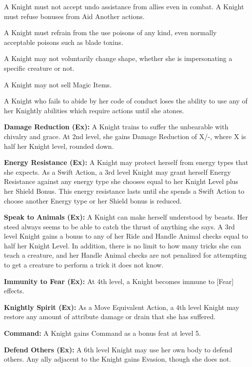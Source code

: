 \begin{itemize*}
\item A Knight must not accept undo assistance from allies even in combat. A Knight must refuse bonuses from Aid Another actions.
\item A Knight must refrain from the use poisons of any kind, even normally acceptable poisons such as blade toxins.
\item A Knight may not voluntarily change shape, whether she is impersonating a specific creature or not.
\item A Knight may not sell Magic Items.
\end{itemize*}

A Knight who fails to abide by her code of conduct loses the ability to use any of her Knightly abilities which require actions until she atones.

\textbf{Damage Reduction (Ex):} A Knight trains to suffer the unbearable with chivalry and grace. At 2nd level, she gains Damage Reduction of X/-, where X is half her Knight level, rounded down.

\textbf{Energy Resistance (Ex):} A Knight may protect herself from energy types that she expects. As a Swift Action, a 3rd level Knight may grant herself Energy Resistance against any energy type she chooses equal to her Knight Level plus her Shield Bonus. This energy resistance lasts until she spends a Swift Action to choose another Energy type or her Shield bonus is reduced.

\textbf{Speak to Animals (Ex):} A Knight can make herself understood by beasts. Her steed always seems to be able to catch the thrust of anything she says. A 3rd level Knight gains a bonus to any of her Ride and Handle Animal checks equal to half her Knight Level. In addition, there is no limit to how many tricks she can teach a creature, and her Handle Animal checks are not penalized for attempting to get a creature to perform a trick it does not know.

\textbf{Immunity to Fear (Ex):} At 4th level, a Knight becomes immune to [Fear] effects.

\textbf{Knightly Spirit (Ex):} As a Move Equivalent Action, a 4th level Knight may restore any amount of attribute damage or drain that she has suffered.

\textbf{Command:} A Knight gains Command as a bonus feat at level 5.

\textbf{Defend Others (Ex):} A 6th level Knight may use her own body to defend others. Any ally adjacent to the Knight gains Evasion, though she does not.


